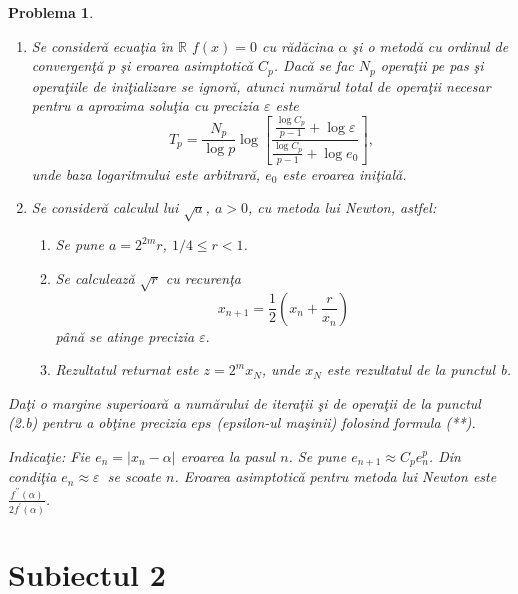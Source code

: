 \documentclass{article}%
\newtheorem{problem}[theorem]{Problema}
\begin{document}
\begin{problem}
\begin{enumerate}
\item Se consider\u{a} ecua\c{t}ia \^{\i}n $\mathbb{R}$ $f(x)=0$ cu
r\u{a}d\u{a}cina $\alpha$ \c{s}i o metod\u{a} cu ordinul de
convergen\c{t}\u{a} $p$ \c{s}i eroarea asimptotic\u{a} $C_{p}$. Dac\u{a} se
fac $N_{p}$ opera\c{t}ii pe pas \c{s}i opera\c{t}iile de ini\c{t}ializare se
ignor\u{a}, atunci num\u{a}rul total de opera\c{t}ii necesar pentru a aproxima
solu\c{t}ia cu precizia $\varepsilon$ este%
\begin{equation}
T_{p}=\frac{N_{p}}{\log p}\log\left[  \frac{\frac{\log C_{p}}{p-1}%
+\log\varepsilon}{\frac{\log C_{p}}{p-1}+\log e_{0}}\right]  ,\tag{**}%
\end{equation}
unde baza logaritmului este arbitrar\u{a}, $e_{0}$ este eroarea ini\c{t}ial\u{a}.

\item Se consider\u{a} calculul lui $\sqrt{a}$, $a>0$, cu metoda lui Newton, astfel:

\begin{enumerate}
\item Se pune $a=2^{2m}r$, $1/4\leq r<1$.

\item Se calculeaz\u{a} $\sqrt{r}$ cu recuren\c{t}a
\[
x_{n+1}=\frac{1}{2}\left(  x_{n}+\frac{r}{x_{n}}\right)
\]
p\^{a}n\u{a} se atinge precizia $\varepsilon.$

\item Rezultatul returnat este $z=2^{m}x_{N}$, unde $x_{N}$ este rezultatul de
la punctul b.
\end{enumerate}
\end{enumerate}

Da\c{t}i o margine superioar\u{a} a num\u{a}rului de itera\c{t}ii \c{s}i de
opera\c{t}ii de la punctul (2.b) pentru a ob\c{t}ine precizia $eps$
(epsilon-ul ma\c{s}inii) folosind formula (**).

\emph{Indica\c{t}ie}: Fie $e_{n}=|x_{n}-\alpha|$ eroarea la pasul $n$. Se pune
$e_{n+1}\approx C_{p}e_{n}^{p}$. Din condi\c{t}ia $e_{n}\approx\varepsilon$
$\ $se scoate $n$. Eroarea asimptotic\u{a} pentru metoda lui Newton este
$\frac{f^{\prime\prime}(\alpha)}{2f^{\prime}(\alpha)}$.
\end{problem}

\newpage

\section{Subiectul 2}
\end{document}
